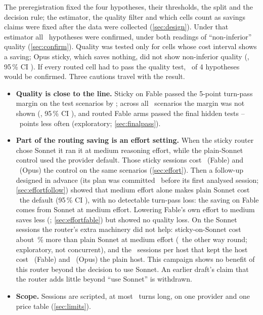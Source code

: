 The preregistration fixed the four hypotheses, their thresholds, the split and the decision rule; the
estimator, the quality filter and which cells count as savings claims were fixed after the data were collected
(\cref{sec:design}). Under that estimator all \NHypConfirmed\ hypotheses were confirmed, under both readings of
``non-inferior'' quality (\cref{sec:confirm}). Quality was tested only for cells whose cost interval shows a
saving; Opus sticky, which saves nothing, did not show non-inferior quality (\QOpusSticky, 95\,\% CI
\QOpusStickyCI). If every routed cell had to pass the quality test, \RvNHypAllQuality\ of 4 hypotheses would be
confirmed. Three cautions travel with the result.
\begin{itemize}
  \item \textbf{Quality is close to the line.} Sticky on Fable passed the 5-point turn-pass margin on the test
    scenarios by \QFableStickyMarginGap; across all \QAllScen\ scenarios the margin was not shown
    (\QAllFableSticky, 95\,\% CI \QAllFableStickyCI), and routed Fable arms passed the final hidden tests
    \FinalGapLow--\FinalGapHigh\ points less often (exploratory; \cref{sec:finalpass}).
  \item \textbf{Part of the routing saving is an effort setting.} When the sticky router chose Sonnet it ran it at
    medium reasoning effort, while the plain-Sonnet control used the provider default. Those sticky sessions cost
    \RvEffFableAll\X\ (Fable) and \RvEffOpusAll\X\ (Opus) the control on the same scenarios (\cref{sec:effort}). Then
    a follow-up designed in advance (its plan was committed \EcFirstAfter\ before its first analysed session;
\cref{sec:effortfollow}) showed that medium effort alone makes plain Sonnet cost \EcRatio\X\ the default (95\,\% CI
    \EcCI), with no detectable turn-pass loss: the saving on Fable comes from Sonnet at medium effort. Lowering Fable's own effort to medium saves less (\EfRatio\X;
    \cref{sec:effortfable}) but showed no quality loss. On the Sonnet sessions the router's extra machinery did not help: sticky-on-Sonnet cost about \EcSecGapPct\,\% more
than plain Sonnet at medium effort (\EcSecRatio\ the other way round; exploratory, not concurrent), and the
\RvStickyHostNFable\ sessions per host that kept the host cost \RvStickyHostFableTwo\X\ (Fable) and
\RvStickyHostOpusTwo\X\ (Opus) the plain host. This campaign shows no benefit of this router beyond the decision to use
Sonnet.
    An earlier draft's claim that the router adds little beyond ``use Sonnet'' is withdrawn.
  \item \textbf{Scope.} Sessions are scripted, at most \MaxTurns\ turns long, on one provider and one price
    table (\cref{sec:limits}).
\end{itemize}

